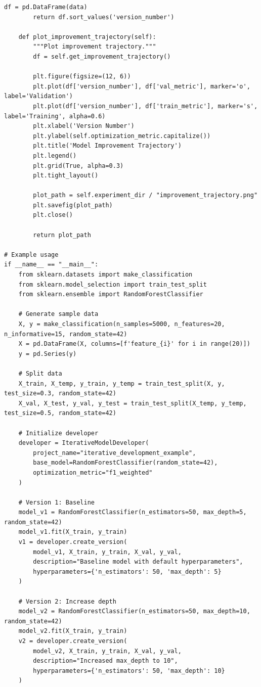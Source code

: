 \begin{lstlisting}[style=python, caption={Iterative Model Development Framework}]
        df = pd.DataFrame(data)
        return df.sort_values('version_number')

    def plot_improvement_trajectory(self):
        """Plot improvement trajectory."""
        df = self.get_improvement_trajectory()

        plt.figure(figsize=(12, 6))
        plt.plot(df['version_number'], df['val_metric'], marker='o', label='Validation')
        plt.plot(df['version_number'], df['train_metric'], marker='s', label='Training', alpha=0.6)
        plt.xlabel('Version Number')
        plt.ylabel(self.optimization_metric.capitalize())
        plt.title('Model Improvement Trajectory')
        plt.legend()
        plt.grid(True, alpha=0.3)
        plt.tight_layout()

        plot_path = self.experiment_dir / "improvement_trajectory.png"
        plt.savefig(plot_path)
        plt.close()

        return plot_path

# Example usage
if __name__ == "__main__":
    from sklearn.datasets import make_classification
    from sklearn.model_selection import train_test_split
    from sklearn.ensemble import RandomForestClassifier

    # Generate sample data
    X, y = make_classification(n_samples=5000, n_features=20, n_informative=15, random_state=42)
    X = pd.DataFrame(X, columns=[f'feature_{i}' for i in range(20)])
    y = pd.Series(y)

    # Split data
    X_train, X_temp, y_train, y_temp = train_test_split(X, y, test_size=0.3, random_state=42)
    X_val, X_test, y_val, y_test = train_test_split(X_temp, y_temp, test_size=0.5, random_state=42)

    # Initialize developer
    developer = IterativeModelDeveloper(
        project_name="iterative_development_example",
        base_model=RandomForestClassifier(random_state=42),
        optimization_metric="f1_weighted"
    )

    # Version 1: Baseline
    model_v1 = RandomForestClassifier(n_estimators=50, max_depth=5, random_state=42)
    model_v1.fit(X_train, y_train)
    v1 = developer.create_version(
        model_v1, X_train, y_train, X_val, y_val,
        description="Baseline model with default hyperparameters",
        hyperparameters={'n_estimators': 50, 'max_depth': 5}
    )

    # Version 2: Increase depth
    model_v2 = RandomForestClassifier(n_estimators=50, max_depth=10, random_state=42)
    model_v2.fit(X_train, y_train)
    v2 = developer.create_version(
        model_v2, X_train, y_train, X_val, y_val,
        description="Increased max_depth to 10",
        hyperparameters={'n_estimators': 50, 'max_depth': 10}
    )


\end{lstlisting}
